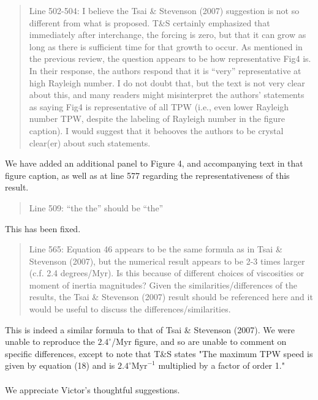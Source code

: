\documentclass[a4paper,12pt]{article}
\begin{document}
\begin{quote}
Line 502-504: I believe the Tsai \& Stevenson (2007) suggestion is not so different from what is proposed. T\&S certainly emphasized that immediately after interchange, the forcing is zero, but that it can grow as long as there is sufficient time for that growth to occur. As mentioned in the previous review, the question appears to be how representative Fig4 is. In their response, the authors respond that it is ``very'' representative at high Rayleigh number. I do not doubt that, but the text is not very clear about this, and many readers might misinterpret the authors’ statements as saying Fig4 is representative of all TPW (i.e., even lower Rayleigh number TPW, despite the labeling of Rayleigh number in the figure caption). I would suggest that it behooves the authors to be crystal clear(er) about such statements.
\end{quote}
We have added an additional panel to Figure 4, and accompanying text in that figure caption, as well as at line 577 regarding the representativeness of this result.
          
\begin{quote}
Line 509: “the the” should be “the”
\end{quote}
This has been fixed.

\begin{quote}
Line 565: Equation 46 appears to be the same formula as in Tsai \& Stevenson (2007), but the numerical result appears to be 2-3 times larger (c.f. 2.4 degrees/Myr). Is this because of different choices of viscosities or moment of inertia magnitudes? Given the similarities/differences of the results, the Tsai \& Stevenson (2007) result should be referenced here and it would be useful to discuss the differences/similarities.
\end{quote}
This is indeed a similar formula to that of Tsai \& Stevenson (2007).
We were unable to reproduce the $2.4^\circ$/Myr figure, and so are unable to comment on specific differences, except to note that T\&S states
"The maximum TPW speed is given by equation (18) and is $2.4^\circ \textrm{Myr}^{-1}$ multiplied by a factor of order 1."
\\
\\
We appreciate Victor's thoughtful suggestions.
\end{document}
